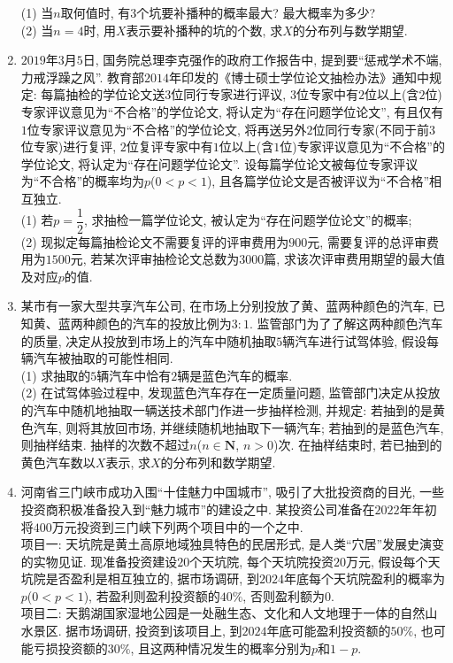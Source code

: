 \documentclass[10pt,a4paper]{article}
\begin{document}
\begin{enumerate}[1.]
(1) 当$n$取何值时, 有$3$个坑要补播种的概率最大? 最大概率为多少?\\
(2) 当$n=4$时, 用$X$表示要补播种的坑的个数, 求$X$的分布列与数学期望.
\item $2019$年$3$月$5$日, 国务院总理李克强作的政府工作报告中, 提到要``惩戒学术不端, 力戒浮躁之风''. 教育部$2014$年印发的《博士硕士学位论文抽检办法》通知中规定: 每篇抽检的学位论文送$3$位同行专家进行评议, $3$位专家中有$2$位以上(含$2$位)专家评议意见为``不合格''的学位论文, 将认定为``存在问题学位论文'', 有且仅有$1$位专家评议意见为``不合格''的学位论文, 将再送另外$2$位同行专家(不同于前$3$位专家)进行复评, $2$位复评专家中有$1$位以上(含$1$位)专家评议意见为``不合格''的学位论文, 将认定为``存在问题学位论文''. 设每篇学位论文被每位专家评议为``不合格''的概率均为$p$($0<p<1$), 且各篇学位论文是否被评议为``不合格''相互独立.\\
(1) 若$p=\dfrac 12$, 求抽检一篇学位论文, 被认定为``存在问题学位论文''的概率;\\
(2) 现拟定每篇抽检论文不需要复评的评审费用为$900$元, 需要复评的总评审费用为$1500$元, 若某次评审抽检论文总数为$3000$篇, 求该次评审费用期望的最大值及对应$p$的值.
\item 某市有一家大型共享汽车公司, 在市场上分别投放了黄、蓝两种颜色的汽车, 已知黄、蓝两种颜色的汽车的投放比例为$3:1$. 监管部门为了了解这两种颜色汽车的质量, 决定从投放到市场上的汽车中随机抽取$5$辆汽车进行试驾体验, 假设每辆汽车被抽取的可能性相同.\\
(1) 求抽取的$5$辆汽车中恰有$2$辆是蓝色汽车的概率.\\
(2) 在试驾体验过程中, 发现蓝色汽车存在一定质量问题, 监管部门决定从投放的汽车中随机地抽取一辆送技术部门作进一步抽样检测, 并规定: 若抽到的是黄色汽车, 则将其放回市场, 并继续随机地抽取下一辆汽车; 若抽到的是蓝色汽车, 则抽样结束. 抽样的次数不超过$n$($n\in \mathbf{N}$, $n>0$)次. 在抽样结束时, 若已抽到的黄色汽车数以$X$表示, 求$X$的分布列和数学期望.
\item 河南省三门峡市成功入围``十佳魅力中国城市'', 吸引了大批投资商的目光, 一些投资商积极准备投入到``魅力城市''的建设之中. 某投资公司准备在$2022$年年初将$400$万元投资到三门峡下列两个项目中的一个之中.\\
项目一: 天坑院是黄土高原地域独具特色的民居形式, 是人类``穴居''发展史演变的实物见证. 现准备投资建设$20$个天坑院, 每个天坑院投资$20$万元, 假设每个天坑院是否盈利是相互独立的, 据市场调研, 到$2024$年底每个天坑院盈利的概率为$p$($0<p<1$), 若盈利则盈利投资额的$40\%$, 否则盈利额为$0$.\\
项目二: 天鹅湖国家湿地公园是一处融生态、文化和人文地理于一体的自然山水景区. 据市场调研, 投资到该项目上, 到$2024$年底可能盈利投资额的$50\%$, 也可能亏损投资额的$30\%$, 且这两种情况发生的概率分别为$p$和$1-p$.\\

\end{enumerate}
\end{document}
